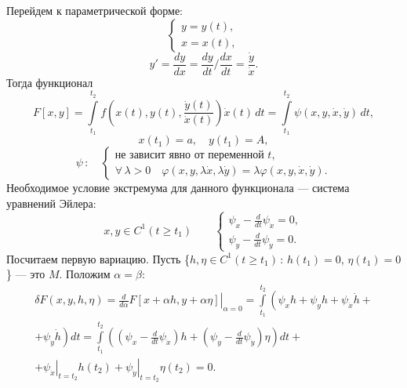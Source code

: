 \documentclass[12pt,a5paper]{book}
\begin{document}
	Перейдем к параметрической форме:
	\begin{equation*}
		\begin{cases}
			y = y(t), \\
			x = x(t),
		\end{cases}
	\end{equation*}
	\begin{equation*}
		y' = \frac{dy}{dx} = \frac{dy}{dt}\big/\frac{dx}{dt} = \frac{\dot{y}}{\dot{x}}.
	\end{equation*}
	Тогда функционал
	\begin{equation*}
		F[x,y] = \int\limits_{t_1}^{t_2} f\left(x(t), y(t), \frac{\dot{y}(t)}{\dot{x}(t)}\right)\dot{x}(t)\,dt = \int\limits_{t_1}^{t_2} \psi(x, y, \dot{x}, \dot{y})\,dt,
	\end{equation*}
	\begin{equation*}
		x(t_1) = a, \quad y(t_1) = A,
	\end{equation*}
	\begin{equation*}
		\psi\,: \quad\begin{cases}
			\text{не зависит явно от переменной $t$}, \\
			\forall\,\lambda > 0 \quad \varphi(x,y,\lambda\dot{x},\lambda\dot{y}) = \lambda\varphi(x,y,\dot{x},\dot{y}).
		\end{cases}
	\end{equation*}
	Необходимое условие экстремума для данного функционала --- система уравнений Эйлера:
	\begin{equation*}
		x, y \in C^1(t \geq t_1) \qquad \begin{cases}
			\psi_x - \frac{d}{dt}\psi_{\dot{x}} = 0, \\
			\psi_y - \frac{d}{dt}\psi_{\dot{y}} = 0.
		\end{cases}
	\end{equation*}
	Посчитаем первую вариацию. Пусть \{$h, \eta \in C^1(t \geq t_1)$\,: $h(t_1) = 0$, $\eta(t_1) = 0$\} --- это $M$. Положим $\alpha = \beta$:
	\begin{equation*}
		\begin{split}
			\delta F(x,y,h,\eta) = \left.\frac{d}{d\alpha}F[x + \alpha h, y + \alpha \eta]\right|_{\alpha=0} = \int\limits_{t_1}^{t_2} \left(\psi_xh + \psi_yh + \psi_{\dot{x}}\dot{h}\right. + \\ \left. + \psi_{\dot{y}}\dot{h}\right)dt = \int\limits_{t_1}^{t_2} \left(\left(\psi_x - \frac{d}{dt}\psi_{\dot{x}}\right)h + \left(\psi_y - \frac{d}{dt}\psi_{\dot{y}}\right)\eta\right)dt + \\ + \left.\psi_{\dot{x}}\right|_{t=t_2}h(t_2) + \left.\psi_{\dot{y}}\right|_{t=t_2}\eta(t_2) = 0.
		\end{split}
	\end{equation*}
\end{document}
